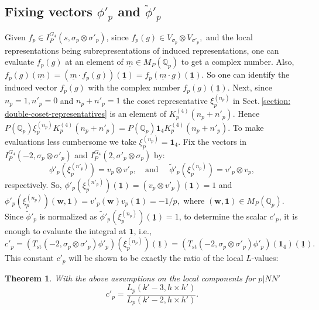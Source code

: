 \documentclass[11pt]{amsart}
\newtheorem{theorem}{Theorem}[section]
\newcommand{\mirp}[1]{K_p^{(4)}(#1)}
\begin{document}
\subsection{Fixing vectors $\phi'_p$ and $\tilde{\phi}'_p$}

 Given $f_p \in I_P^{G_4}(s, \sigma_p \otimes \sigma'_p)$, since $f_p(g) \in V_{\sigma_p} \otimes V_{\sigma'_p},$ and  
the local representations being subrepresentations of induced representations, one can evaluate $f_p(g)$ at an element of 
$\underline{m}\in M_P(\mathbb{Q}_p)$ to get a complex number. Also,
$f_p(g)(\underline{m}) = (\underline{m}\cdot f_p(g))(\underline{\mathbf{1}}) = f_p(\underline{m}\cdot g)(\underline{\mathbf{1}}).$
So one can identify the induced vector $f_p(g)$ with the complex number $f_p(g)(\underline{\mathbf{1}})$.
Next, since $n_p = 1, n'_p = 0$ and $n_p + n'_p = 1$ the coset representative $\xi_p^{(n_p)}$ in Sect.\,\ref{section: double-coset-representatives} is an element of $\mirp{n_p + n'_p}.$ 
Hence $P(\mathbb{Q}_p) \xi_p^{(n_p)}\mirp{n_p +n'_p} = P(\mathbb{Q}_p) \mathbf{1}_4 \mirp{n_p +n'_p}.$ 
To make evaluations less cumbersome we take $\xi_p^{(n_p)} = \mathbf{1}_4$.  
Fix the vectors in $I_P^{G_4}(-2,\sigma_p \otimes \sigma'_p)$ and $I_P^{G_4}(2, \sigma'_p \otimes \sigma_p)$ by: 
\begin{equation}
	\phi'_p(\xi_p^{(n'_p)}) = v_p \otimes v'_p, \quad \text{and } \quad \tilde{\phi}'_p(\xi_p^{(n_p)}) = v'_p \otimes v_p,
\end{equation}
respectively. So, 
$\phi'_p(\xi_p^{(n'_p)})(\underline{\mathbf{1}}) = (v_p \otimes v'_p)(\underline{\mathbf{1}}) = 1$ and 
$\phi'_p(\xi_p^{(n_p)})(\mathbf{w}, \mathbf{1}) = v'_p(\mathbf{w}) v_p(\mathbf{1}) = -1/p,$ where $(\mathbf{w}, \mathbf{1}) \in M_P(\mathbb{Q}_p).$ 
Since $\tilde{\phi}'_p$ is normalized as $\tilde{\phi}'_p(\xi_p^{(n_p)})(\underline{\mathbf{1}}) = 1$, to determine the scalar $c'_p$, 
it is enough to evaluate the integral at $\underline{\mathbf{1}}$, i.e.,
\[c'_p = (T_{\text{st}}(-2, \sigma_p \otimes \sigma'_p)\phi'_p)(\xi_p^{(n_p)})(\underline{\mathbf{1}}) = (T_{\text{st}}(-2, \sigma_p \otimes \sigma'_p)\phi'_p)(\mathbf{1}_4)(\underline{\mathbf{1}}).\]
This constant $c'_p$ will be shown to be exactly the ratio of the local $L$-values: 

\begin{theorem}
\label{thm:local-calculation}
	With the above assumptions on the local components for $p|NN'$
	$$
		c'_p = \frac{L_p(k'-3, h\times h')}{L_p(k'-2, h \times h')}.
	$$
\end{theorem}
\end{document}
